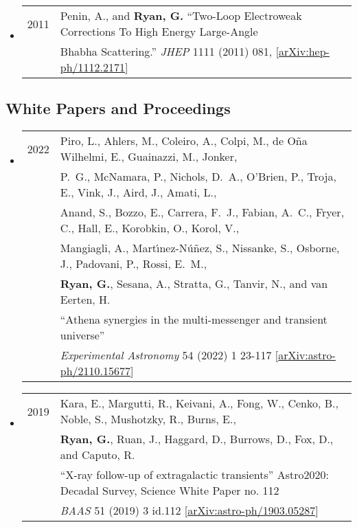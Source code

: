 \begin{itemize}
\item \begin{tabular}{ll}
2011 & Penin, A., and {\bf Ryan, G.}  ``Two-Loop Electroweak Corrections To High Energy Large-Angle \\& Bhabha Scattering.'' \emph{JHEP} 1111 (2011) 081, [\href{https://arxiv.org/abs/1112.2171}{arXiv:hep-ph/1112.2171}] \\
\end{tabular}
\end{itemize}

\subsection*{White Papers and Proceedings}
\begin{itemize}

\item \begin{tabular}{ll}
2022 & {Piro}, L., {Ahlers}, M., {Coleiro}, A., {Colpi}, M., {de O{\~n}a Wilhelmi}, E., {Guainazzi}, M., {Jonker}, \\
	& P.~G., {McNamara}, P., {Nichols}, D.~A., {O'Brien}, P., {Troja}, E., {Vink}, J., {Aird}, J., {Amati}, L., \\
	& {Anand}, S., {Bozzo}, E., {Carrera}, F.~J., {Fabian}, A.~C., {Fryer}, C., {Hall}, E., {Korobkin}, O., {Korol}, V.,\\
	&  {Mangiagli}, A., {Mart{\'\i}nez-N{\'u}{\~n}ez}, S., {Nissanke}, S., {Osborne}, J., {Padovani}, P., {Rossi}, E.~M.,\\
	&  {\bf {Ryan}, G.}, {Sesana}, A., {Stratta}, G., {Tanvir}, N., and {van Eerten}, H. \\
	& ``Athena synergies in the multi-messenger and transient universe'' \\
	& \emph{Experimental Astronomy} 54 (2022) 1 23-117 [\href{https://arxiv.org/abs/2110.15677}{arXiv:astro-ph/2110.15677}]
\end{tabular}

\item \begin{tabular}{ll}
2019 & {Kara}, E., {Margutti}, R., {Keivani}, A., {Fong}, W., {Cenko}, B., {Noble}, S., {Mushotzky}, R., {Burns}, E., \\
	& {\bf {Ryan}, G.}, {Ruan}, J.,  {Haggard}, D., {Burrows}, D., {Fox}, D., and {Caputo}, R. \\
	& ``{X-ray follow-up of extragalactic transients}'' Astro2020: Decadal Survey, Science White Paper no. 112 \\
	& \emph{BAAS} 51 (2019) 3 id.112 [\href{https://arxiv.org/abs/1903.05287}{arXiv:astro-ph/1903.05287}]
\end{tabular}


\end{itemize}
